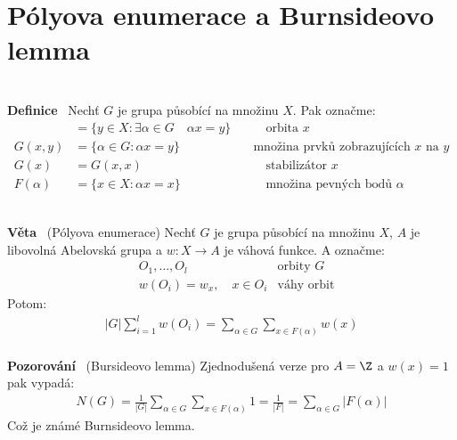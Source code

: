 \documentclass{article}
\renewcommand{\paragraph}[1]{\ \\\smallskip\noindent\textbf{#1}\ }
\begin{document}
\section{Pólyova enumerace a Burnsideovo lemma}
\paragraph{Definice} Nechť $G$ je grupa působící na množinu $X$. Pak označme:
\begin{align}
	[x] &= \{y \in X: \exists \alpha \in G \quad \alpha x = y\} 
	\quad&\quad\text{orbita $x$} \\
	G(x,y) &= \{\alpha \in G: \alpha x = y \} & \text{množina prvků 
	zobrazujících $x$ na $y$}\\
	G(x) &= G(x,x)  \quad&\quad\text{stabilizátor $x$}\\
	F(\alpha) &= \{x \in X: \alpha x = x \}  \quad&\quad\text{množina 
	pevných bodů $\alpha$}
\end{align}

\paragraph{Věta} (Pólyova enumerace) Nechť $G$ je grupa působící na množinu $X$, 
$A$ je libovolná Abelovská grupa a $w: X \to A$ je váhová funkce. A označme:
\begin{align}
	&O_1, \dots, O_l & \text{orbity $G$} \\
	&w(O_i) = w_x, \quad x \in O_i & \text{váhy orbit}
\end{align}
Potom:
\begin{align}
	|G| \sum_{i=1}^l w(O_i) = \sum_{\alpha\in G} \sum_{x \in F(\alpha)} w(x)
\end{align}
\paragraph{Pozorování} (Bursideovo lemma) Zjednodušená verze pro $A=\Z$ a 
$w(x)=1$ pak vypadá:
\begin{align}
	N(G) = \frac{1}{|G|} \sum_{\alpha \in G} \sum_{x \in F(\alpha)} 1 = 
	\frac{1}{|F|} = \sum_{\alpha \in G} |F(\alpha)|
\end{align}
Což je známé Burnsideovo lemma.
\end{document}
